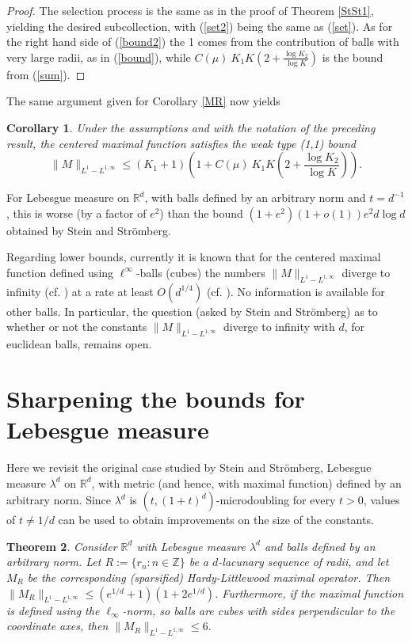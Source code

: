 \documentclass[12pt]{amsart}
\newtheorem{theorem}{Theorem}[section]
\newtheorem{corollary}[theorem]{Corollary}
\theoremstyle{definition}
\theoremstyle{parrafo}
\begin{document}
  \begin{proof} The selection process is the same as in the proof of Theorem \ref{StSt1},
  yielding the desired subcollection,  with (\ref{set2}) being the same as (\ref{set}). 
  As for the right hand side of (\ref{bound2}) the 1 comes from the contribution of balls
  with very large radii, as in (\ref{bound}), while 
  $C(\mu) \ K_1 K \left(2 + \frac{\log K_2}{\log K}\right)$
  is the bound from (\ref{sum}).
 \end{proof} 

The same argument given for Corollary \ref{MR} now yields
  
 \begin{corollary}\label{M} Under the assumptions and with the notation of the preceding result, 
the centered maximal function satisfies the weak type (1,1) bound  
$$\|M\|_{L^1-L^{1,\infty}} \le (K_1 + 1) \left( 1 +  C(\mu) \ K_1 K \left(2 + \frac{\log K_2}{\log K}\right)\right).$$
 \end{corollary}

 For Lebesgue measure on $\mathbb{R}^d$,
with balls defined by an arbitrary norm and $t = d^{-1}$, this is worse (by a factor of $e^2$) than the bound $(1 + e^2) (1 + o(1)) e^2 d \log d$ 
obtained by Stein and Str\"omberg.

Regarding lower bounds,
currently it is known that for the centered maximal function defined using  $\ell^\infty$-balls (cubes) 
 the  numbers  $\|M\|_{L^1-L^{1,\infty}}$ diverge to
infinity (cf. \cite{A}) 
 at a rate at least $O(d^{1/4})$  (cf.  \cite{IaSt}). No information is available for other balls. In particular, the
question   (asked by Stein and Str\"omberg) as to whether or not the constants $\|M\|_{L^1-L^{1,\infty}}$ diverge to
infinity with $d$, for  euclidean balls, remains open.

 
\section{Sharpening the bounds for Lebesgue measure}

Here we revisit the  original case studied by 
Stein and Str\"omberg, Lebesgue measure  $\lambda^d$ on $\mathbb{R}^d$, with metric
(and hence, with maximal function) defined by an arbitrary norm.
 Since  $\lambda^d$ is $(t, (1 + t)^d)$-microdoubling for
every $t > 0$, values of $t\ne 1/d$ can be used to obtain  improvements on the size of the constants.
 

\begin{theorem}\label{SSLebesgue}  Consider $\mathbb{R}^d$ with Lebesgue measure
$\lambda^d$ and balls defined by an arbitrary norm. Let $R:= \{r_n: n\in \mathbb{Z}\}$ be a $d$-lacunary sequence of radii, and let $M_R$ be 
the corresponding (sparsified) Hardy-Littlewood
maximal operator. Then $\|M_R\|_{L^1-L^{1,\infty}} \le (e^{1/d} + 1) (1 + 2  e^{1/d})$.
Furthermore,  if the maximal function is defined using the $\ell_\infty$-norm, so balls
are cubes with sides perpendicular to the coordinate axes, then $\|M_R\|_{L^1-L^{1,\infty}} \le 6.$ 
\end{theorem}
\end{document}

